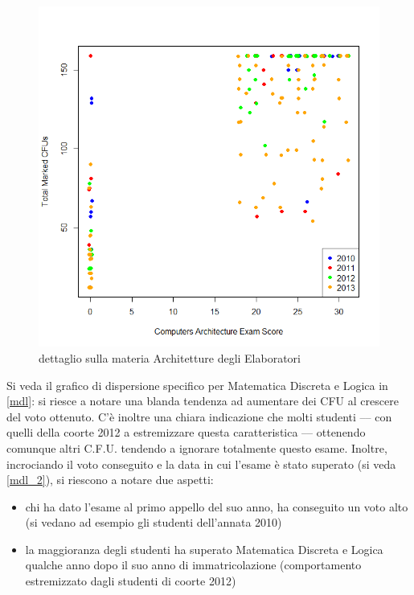 \begin{figure}
    \centering
    \caption{dettaglio sulla materia Architetture degli Elaboratori}
    \label{ade}
	\includegraphics[scale=0.5]{img/scatter_plot_6.png}
\end{figure}

Si veda il grafico di dispersione specifico per Matematica Discreta e Logica in \ref{mdl}: si riesce a notare una blanda tendenza ad aumentare dei CFU al crescere del voto ottenuto. C’è inoltre una chiara indicazione che molti studenti –-- con quelli della coorte 2012 a estremizzare questa caratteristica –-- ottenendo comunque altri C.F.U. tendendo a ignorare totalmente questo esame. Inoltre, incrociando il voto conseguito e la data in cui l’esame è stato superato (si veda \ref{mdl_2}), si riescono a notare due aspetti:

\begin{itemize}
    \item chi ha dato l’esame al primo appello del suo anno, ha conseguito un voto alto (si vedano ad esempio gli studenti dell’annata 2010)
    \item la maggioranza degli studenti ha superato Matematica Discreta e Logica qualche anno dopo il suo anno di immatricolazione (comportamento estremizzato dagli studenti di coorte 2012)
\end{itemize}

